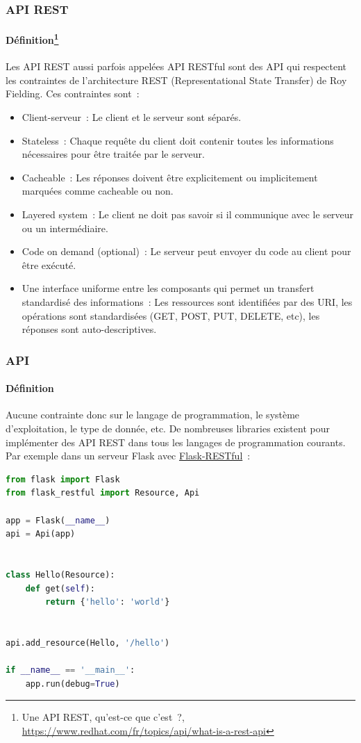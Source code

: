 \documentclass{beamer}
\begin{document}
    \begin{frame}
        \transdissolve
        \frametitle{API REST}
        \framesubtitle{Définition\footnote{Une API REST, qu'est-ce que c'est~?, \url{https://www.redhat.com/fr/topics/api/what-is-a-rest-api}}}
        \begin{footnotesize}
            Les API REST aussi parfois appelées API RESTful sont des API qui respectent les contraintes de l'architecture REST (Representational State Transfer) de Roy Fielding.
            \bigbreak
            Ces contraintes sont~:
            \begin{itemize}
                \item Client-serveur~: Le client et le serveur sont séparés.
                \item Stateless~: Chaque requête du client doit contenir toutes les informations nécessaires pour être traitée par le serveur.
                \item Cacheable~: Les réponses doivent être explicitement ou implicitement marquées comme cacheable ou non.
                \item Layered system~: Le client ne doit pas savoir si il communique avec le serveur ou un intermédiaire.
                \item Code on demand (optional)~: Le serveur peut envoyer du code au client pour être exécuté.
                \item Une interface uniforme entre les composants qui permet un transfert standardisé des informations~: Les ressources sont identifiées par des URI, les opérations sont standardisées (GET, POST, PUT, DELETE, etc), les réponses sont auto-descriptives.
            \end{itemize}
        \end{footnotesize}
    \end{frame}

    \begin{frame}[fragile]
        \transdissolve
        \frametitle{API}
        \framesubtitle{Définition}
        Aucune contrainte donc sur le langage de programmation, le système d'exploitation, le type de donnée, etc.
        \bigbreak
        De nombreuses libraries existent pour implémenter des API REST dans tous les langages de programmation courants.
        \bigbreak
        Par exemple dans un serveur Flask avec \href{https://flask-restful.readthedocs.io/en/latest/}{Flask-RESTful}~:
        \begin{lstlisting}[language=python,basicstyle=\ttfamily\tiny]
from flask import Flask
from flask_restful import Resource, Api

app = Flask(__name__)
api = Api(app)


class Hello(Resource):
    def get(self):
        return {'hello': 'world'}


api.add_resource(Hello, '/hello')

if __name__ == '__main__':
    app.run(debug=True)
        \end{lstlisting}
    \end{frame}
\end{document}
